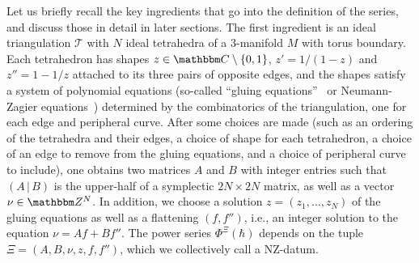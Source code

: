 \documentclass[12pt,reqno]{amsart}
\theoremstyle{definition}
\def\BZ{\mathbbm Z}
\def\BC{\mathbbm C}
\def\calT{\mathcal T}
\renewcommand{\=}{\;=\;}
\begin{document}
Let us briefly recall the key ingredients that go into the definition of the
series, and discuss those in detail in later sections. The first ingredient is  
an ideal triangulation $\calT$ with $N$ ideal tetrahedra of a 3-manifold $M$ with
torus boundary. Each tetrahedron has shapes $z \in \BC\setminus\{0,1\}$, $z'=1/(1-z)$
and $z''=1-1/z$ attached to its three pairs of opposite edges, and the shapes
satisfy a system of polynomial equations (so-called ``gluing equations''~\cite{Th} or
Neumann-Zagier equations~\cite{NZ}) determined by the combinatorics
of the triangulation, one for each edge and peripheral curve. After some choices
are made (such as an ordering of the tetrahedra and their edges, a choice of shape
for each tetrahedron, a choice of an edge to remove from the gluing equations, and
a choice of peripheral curve to include), one obtains two matrices $A$ and $B$
with integer entries such that $(A\,|\,B)$ is the upper-half of a symplectic $2N \times
2N$ matrix, as well as a vector $\nu \in \BZ^N$. In addition, we choose a solution
$z=(z_1,\dots,z_N)$ of the gluing equations as well as a flattening $(f,f'')$, i.e.,
an integer solution to the equation $\nu = A f + B f''$. The power series
$\Phi^\Xi(\hbar)$ depends on the tuple $\Xi=(A,B,\nu,z,f,f'')$, which we collectively
call a NZ-datum. 
\end{document}
